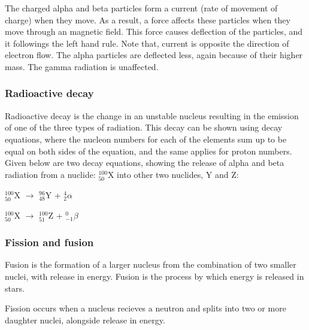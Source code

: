 The charged alpha and beta particles form a current (rate of movement of charge) when they move. As
a result, a force affects these particles when they move through an magnetic field. This force
causes deflection of the particles, and it followings the left hand rule. Note that, current is
opposite the direction of electron flow. The alpha particles are deflected less, again because of
their higher mass. The gamma radiation is unaffected.

\subsubsection{Radioactive decay}
Radioactive decay is the change in an unstable nucleus resulting in the emission of one of the
three types of radiation. This decay can be shown using decay equations, where the nucleon numbers
for each of the elements sum up to be equal on both sides of the equation, and the same applies
for proton numbers. Given below are two decay equations, showing the release of alpha and beta
radiation from a nuclide: $^{100}_{50}$X into other two nuclides, Y and Z:
\begin{center}
	$^{100}_{50}$X $\rightarrow$ $^{96}_{48}$Y + $^4_2\alpha$

	$^{100}_{50}$X $\rightarrow$ $^{100}_{51}$Z + $^0_{-1}\beta$
\end{center}

\subsubsection{Fission and fusion}
Fusion is the formation of a larger nucleus from the combination of two smaller nuclei, with 
release in energy. Fusion is the process by which energy is released in stars.

Fission occurs when a nucleus recieves a neutron and splits into two or more daughter nuclei, 
alongside release in energy.
